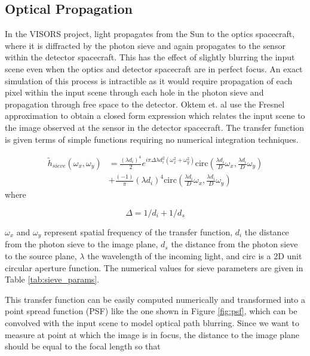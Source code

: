 \documentclass[tocnosub,noragright,centerchapter,12pt]{uiucecethesis09}
\begin{document}
\subsection{Optical Propagation}

In the VISORS project, light propagates from the Sun to the optics spacecraft, where it is diffracted by the photon sieve and again propagates to the sensor within the detector spacecraft.  This has the effect of slightly blurring the input scene even when the optics and detector spacecraft are in perfect focus.  An exact simulation of this process is intractible as it would require propagation of each pixel within the input scene through each hole in the photon sieve and propagation through free space to the detector.  Oktem et. al \cite{oktem2018} use the Fresnel approximation to obtain a closed form expression which relates the input scene to the image observed at the sensor in the detector spacecraft.  The transfer function is given terms of simple functions requiring no numerical integration techniques.



\begin{align*}
  \tilde{h}_{sieve}(\omega_x, \omega_y) &=
  \frac{(\lambda d_i)^4}{2} e^{i \pi \Delta \lambda d_i^2 (\omega_x^2 + \omega_y^2)} \text{circ}\left(\frac{\lambda d_i}{D}\omega_x, \frac{\lambda d_i}{D} \omega_y \right) \\
  &+ \frac{(-1)}{\pi} (\lambda d_i)^4 \text{circ}\left(\frac{\lambda d_i}{D}\omega_x, \frac{\lambda d_i}{D} \omega_y \right)
\end{align*}
where

$$\Delta = 1/d_i + 1/d_s$$

$\omega_x$ and $\omega_y$ represent spatial frequency of the transfer function, $d_i$ the distance from the photon sieve to the image plane, $d_s$ the distance from the photon sieve to the source plane, $\lambda$ the wavelength of the incoming light, and $\text{circ}$ is a 2D unit circular aperture function.  The numerical values for sieve parameters are given in Table \ref{tab:sieve_params}.

This transfer function can be easily computed numerically and transformed into a point spread function (PSF) like the one shown in Figure \ref{fig:psf}, which can be convolved with the input scene to model optical path blurring.  Since we want to measure at point at which the image is in focus, the distance to the image plane should be equal to the focal length so that
\end{document}
